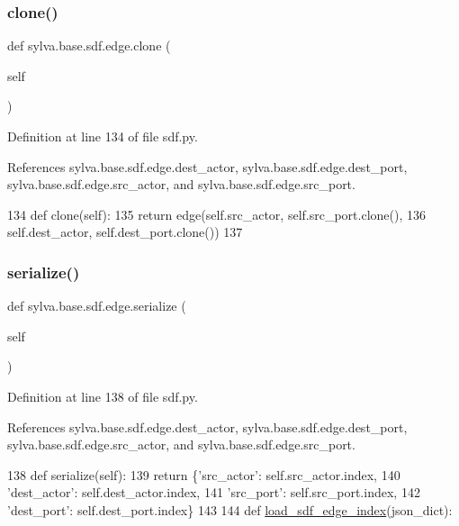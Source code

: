 \subsubsection{\texorpdfstring{clone()}{clone()}}
{\footnotesize\ttfamily def sylva.\+base.\+sdf.\+edge.\+clone (\begin{DoxyParamCaption}\item[{}]{self }\end{DoxyParamCaption})}



Definition at line 134 of file sdf.\+py.



References sylva.\+base.\+sdf.\+edge.\+dest\+\_\+actor, sylva.\+base.\+sdf.\+edge.\+dest\+\_\+port, sylva.\+base.\+sdf.\+edge.\+src\+\_\+actor, and sylva.\+base.\+sdf.\+edge.\+src\+\_\+port.


\begin{DoxyCode}
134         \textcolor{keyword}{def }clone(self):
135             \textcolor{keywordflow}{return} edge(self.src\_actor, self.src\_port.clone(),
136                         self.dest\_actor, self.dest\_port.clone())
137 
\end{DoxyCode}
\mbox{\label{classsylva_1_1base_1_1sdf_1_1edge_a10a8a20cd0052b046c627e7e22af114d}} 
\subsubsection{\texorpdfstring{serialize()}{serialize()}}
{\footnotesize\ttfamily def sylva.\+base.\+sdf.\+edge.\+serialize (\begin{DoxyParamCaption}\item[{}]{self }\end{DoxyParamCaption})}



Definition at line 138 of file sdf.\+py.



References sylva.\+base.\+sdf.\+edge.\+dest\+\_\+actor, sylva.\+base.\+sdf.\+edge.\+dest\+\_\+port, sylva.\+base.\+sdf.\+edge.\+src\+\_\+actor, and sylva.\+base.\+sdf.\+edge.\+src\+\_\+port.


\begin{DoxyCode}
138         \textcolor{keyword}{def }serialize(self):
139             \textcolor{keywordflow}{return} \{\textcolor{stringliteral}{'src\_actor'}: self.src\_actor.index,
140                     \textcolor{stringliteral}{'dest\_actor'}: self.dest\_actor.index,
141                     \textcolor{stringliteral}{'src\_port'}: self.src\_port.index,
142                     \textcolor{stringliteral}{'dest\_port'}: self.dest\_port.index\}
143 
144     \textcolor{keyword}{def }\hyperlink{namespacesylva_1_1base_1_1sdf_a67886f481ab9be68797400241d754f64}{load\_sdf\_edge\_index}(json\_dict):
\end{DoxyCode}


